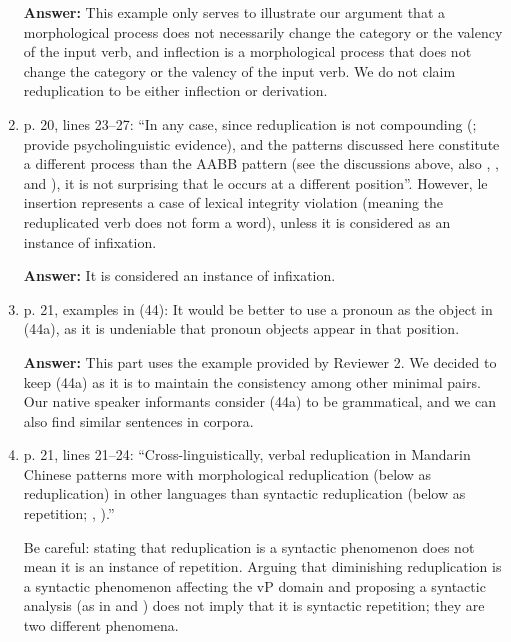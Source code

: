 \documentclass[fleqn,twoside]{article}
\begin{document}
\begin{enumerate}
\noindent
\textbf{Answer:} This example only serves to illustrate our argument 
that a morphological process does not necessarily change 
the category or the valency of the input verb, 
and inflection is a morphological process that 
does not change the category or the valency of the input verb. 
We do not claim reduplication to be either inflection or derivation.


\item p. 20, lines 23--27: ``In any case, since reduplication is not compounding (\citealt[149--150]{Sui2018}; \citealt{GaoEtAl2021} provide psycholinguistic evidence), and the patterns discussed here constitute a different
process than the AABB pattern (see the discussions above, also \citealt[Sec. 4.3]{Deng2013}, \citealt[Sec. 2]{SuiHu2016}, \citealt{Sui2018} and \citealt{Wang2023}), it is not surprising that le occurs at a different position''.
However, le insertion represents a case of lexical integrity violation (meaning the reduplicated verb
does not form a word), unless it is considered as an instance of infixation.

\noindent
\textbf{Answer:} It is considered an instance of infixation.

\item p. 21, examples in (44): It would be better to use a pronoun as the object in (44a), as it is undeniable
that pronoun objects appear in that position.

\noindent
\textbf{Answer:} This part uses the example provided by Reviewer 2. We decided to keep (44a) as it is to maintain the consistency among other minimal pairs. Our native speaker informants consider (44a) to be grammatical, and we can also find similar sentences in corpora.

\item p. 21, lines 21--24: ``Cross-linguistically, verbal reduplication in Mandarin Chinese patterns more with
morphological reduplication (below as reduplication) in other languages than syntactic reduplication
(below as repetition; \citealt[31]{Gil2005}, \citealt[1--2]{Forza2016}).''

Be careful: stating that reduplication is a syntactic phenomenon does not mean it is an instance of
repetition. Arguing that diminishing reduplication is a syntactic phenomenon affecting the vP domain
and proposing a syntactic analysis (as in \citealt{Arcodiaetal2014} and \citealt{BascianoMelloni2017}) does not imply that it is syntactic repetition; they are two different phenomena.


\end{enumerate}
\end{document}
